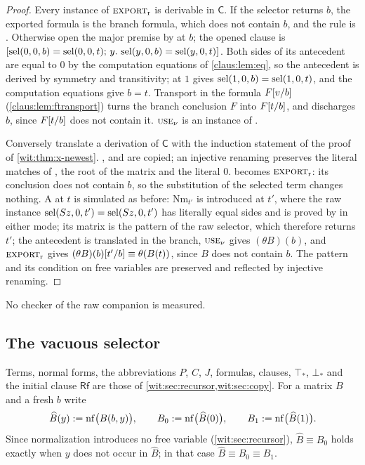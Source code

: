 \begin{proof}
Every instance of $\rulename{Export}_{\mathrm r}$ is derivable in
$\mathsf{C}$.  If the selector returns $b$, the exported formula is the
branch formula, which does not contain $b$, and the rule is .
Otherwise open the major premise by  at $b$; the opened clause
is $[\operatorname{sel}(0,0,b)=\operatorname{sel}(0,0,t);\,y.\,\operatorname{sel}(y,0,b)=\operatorname{sel}(y,0,t)]$.  Both sides of
its antecedent are equal to $0$ by the computation equations of
\cref{claus:lem:eq}, so the antecedent is derived by symmetry and
transitivity;  at $1$ gives $\operatorname{sel}(1,0,b)=\operatorname{sel}(1,0,t)$, and the
computation equations give $b=t$.  Transport in the formula $F[v/b]$
(\cref{claus:lem:ftransport}) turns the branch conclusion $F$ into
$F[t/b]$, and  discharges $b$, since $F[t/b]$
does not contain it.  $\rulename{Use}_\nu$ is an instance of .

Conversely translate a derivation of $\mathsf{C}$ with the induction
statement of the proof of \cref{wit:thm:x-newest}.  ,
 and  are copied; an injective renaming
preserves the literal matches of , the root of the matrix and
the literal $0$.   becomes $\rulename{Export}_{\mathrm r}$:
its conclusion does not contain $b$, so the substitution of the selected
term changes nothing.  A  at $t$ is simulated as before:
$\mathrm{Nm}_{t'}$ is introduced at $t'$, where the raw instance
$\operatorname{sel}(S z,0,t')=\operatorname{sel}(S z,0,t')$ has literally equal sides and is
proved by  in either mode; its matrix is the pattern of the
raw selector, which therefore returns $t'$; the antecedent is translated in
the branch, $\rulename{Use}_\nu$ gives $(\theta B)(b)$, and
$\rulename{Export}_{\mathrm r}$ gives $(\theta B)(b)[t'/b]\equiv
\theta(B(t))$, since $B$ does not contain $b$.  The pattern and its
condition on free variables are preserved and reflected by injective
renaming.
\end{proof}

No checker of the raw companion is measured.

\subsection{The vacuous selector}
\label{wit:sec:vac}

Terms, normal forms, the abbreviations $P$, $C$, $J$, formulas, clauses,
$\top_{*}$, $\bot_{*}$ and the initial clause $\mathsf{Rf}$ are those of
\cref{wit:sec:recursor,wit:sec:copy}.  For a matrix $B$ and a fresh $b$ write
\[
 \widehat B(y)\mathrel{:=}\operatorname{nf}\bigl(B(b,y)\bigr),\qquad
 B_0\mathrel{:=}\operatorname{nf}\bigl(\widehat B(0)\bigr),\qquad
 B_1\mathrel{:=}\operatorname{nf}\bigl(\widehat B(1)\bigr).
\]
Since normalization introduces no free variable (\cref{wit:sec:recursor}),
$\widehat B\equiv B_0$ holds exactly when $y$ does not occur in
$\widehat B$; in that case $\widehat B\equiv B_0\equiv B_1$.


